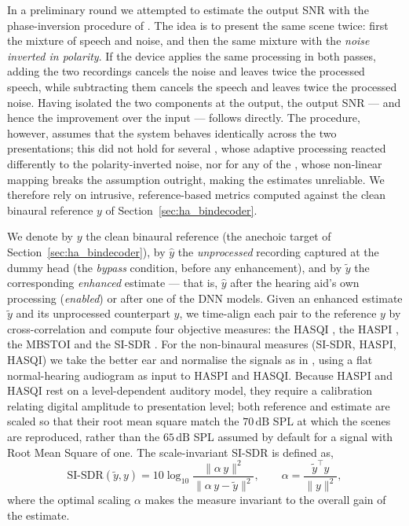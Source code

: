 In a preliminary round we attempted to estimate the output \acrshort{SNR} with
the phase-inversion procedure of \citet{hagerman2004method}. The idea is to
present the same scene twice: first the mixture of speech and noise, and then
the same mixture with the \emph{noise inverted in polarity}. If the device
applies the same processing in both passes, adding the two recordings cancels
the noise and leaves twice the processed speech, while subtracting them cancels
the speech and leaves twice the processed noise. Having isolated the two
components at the output, the output \acrshort{SNR} --- and hence the improvement
over the input --- follows directly. The procedure, however, assumes that the
system behaves identically across the two presentations; this did not hold for
several , whose adaptive processing reacted differently to the
polarity-inverted noise, nor for any of the , whose non-linear
mapping breaks the assumption outright, making the estimates unreliable. We
therefore rely on intrusive, reference-based metrics computed against the clean
binaural reference $y$ of Section~\ref{sec:ha_bindecoder}.

We denote by $y$ the clean binaural reference (the anechoic target of
Section~\ref{sec:ha_bindecoder}), by $\hat{y}$ the \emph{unprocessed} recording
captured at the dummy head (the \emph{bypass} condition, before any enhancement),
and by $\tilde{y}$ the corresponding \emph{enhanced} estimate --- that is,
$\hat{y}$ after the hearing aid's own processing (\emph{enabled}) or after one of
the \acrshort{DNN} models. Given an enhanced estimate $\tilde{y}$ and its
unprocessed counterpart $\hat{y}$, we time-align each pair to the reference $y$ by
cross-correlation and compute four objective measures: the \acrfull{HASQI}
\citep{hasqi}, the \acrfull{HASPI} \citep{haspi}, the \acrfull{MBSTOI}
\citep{andersen2018refinement} and the \acrfull{SI-SDR} \citep{le2019sdr}. For
the non-binaural measures (\acrshort{SI-SDR}, \acrshort{HASPI}, \acrshort{HASQI})
we take the better ear and normalise the signals as in \citet{clarity}, using a
flat normal-hearing audiogram as input to \acrshort{HASPI} and \acrshort{HASQI}.
Because \acrshort{HASPI} and \acrshort{HASQI} rest on a level-dependent auditory
model, they require a calibration relating digital amplitude to presentation
level; both reference and estimate are scaled so that their root mean square
match the $70\,\text{dB}$ \acrshort{SPL} at which the scenes are reproduced, rather than the $65\,\text{dB}$ \acrshort{SPL}
assumed by default for a signal with Root Mean Square of one. The
scale-invariant \acrshort{SI-SDR} is defined as,
\begin{equation}
    \mathrm{SI\text{-}SDR}(\tilde{y}, y) =
    10\log_{10}\frac{\lVert \alpha\, y \rVert^{2}}
                    {\lVert \alpha\, y - \tilde{y} \rVert^{2}},
    \qquad
    \alpha = \frac{\tilde{y}^{\top} y}{\lVert y \rVert^{2}},
    \label{eq:sisdr}
\end{equation}
where the optimal scaling $\alpha$ makes the measure invariant to the overall
gain of the estimate.

